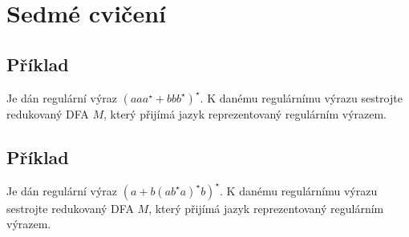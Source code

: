 \section{Sedmé cvičení}

\subsection{Příklad}
Je dán regulární výraz $(aaa^\star + bbb^\star)^\star$. K danému regulárnímu výrazu sestrojte redukovaný DFA $M$, který přijímá jazyk reprezentovaný regulárním výrazem.

\subsection{Příklad}
Je dán regulární výraz $(a + b(ab^\star a)^\star b)^\star$. K danému regulárnímu výrazu sestrojte redukovaný DFA $M$, který přijímá jazyk reprezentovaný regulárním výrazem.